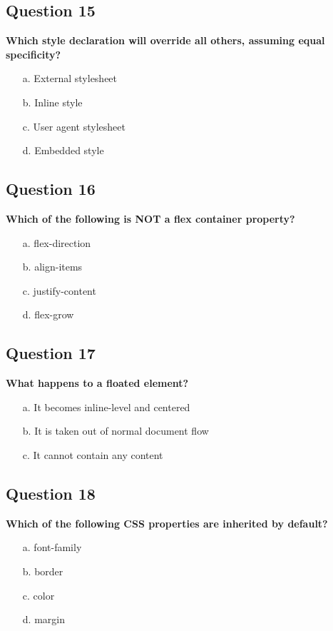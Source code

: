 \documentclass{article}
\begin{document}
\subsection*{Question 15}
\textbf{Which style declaration will override all others, assuming equal specificity?}

\begin{itemize}
  \item[a.] External stylesheet
  \item[b.] Inline style
  \item[c.] User agent stylesheet
  \item[d.] Embedded style
\end{itemize}

\subsection*{Question 16}
\textbf{Which of the following is NOT a flex container property?}

\begin{itemize}
  \item[a.] flex-direction
  \item[b.] align-items
  \item[c.] justify-content
  \item[d.] flex-grow
\end{itemize}

\subsection*{Question 17}
\textbf{What happens to a floated element?}

\begin{itemize}
  \item[a.] It becomes inline-level and centered
  \item[b.] It is taken out of normal document flow
  \item[c.] It cannot contain any content
\end{itemize}

\subsection*{Question 18}
\textbf{Which of the following CSS properties are inherited by default?}

\begin{itemize}
  \item[a.] font-family
  \item[b.] border
  \item[c.] color
  \item[d.] margin
\end{itemize}
\end{document}
